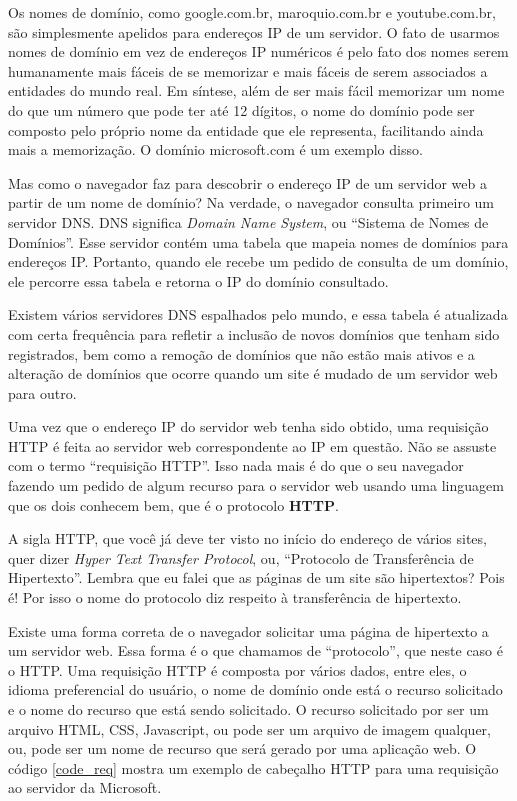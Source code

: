 Os nomes de domínio, como google.com.br, maroquio.com.br e youtube.com.br, são simplesmente apelidos para endereços IP de um servidor. O fato de usarmos nomes de domínio em vez de endereços IP numéricos é pelo fato dos nomes serem humanamente mais fáceis de se memorizar e mais fáceis de serem associados a entidades do mundo real. Em síntese, além de ser mais fácil memorizar um nome do que um número que pode ter até 12 dígitos, o nome do domínio pode ser composto pelo próprio nome da entidade que ele representa, facilitando ainda mais a memorização. O domínio microsoft.com é um exemplo disso.

Mas como o navegador faz para descobrir o endereço IP de um servidor web a partir de um nome de domínio? Na verdade, o navegador consulta primeiro um servidor DNS. DNS significa \textit{Domain Name System}, ou ``Sistema de Nomes de Domínios''. Esse servidor contém uma tabela que mapeia nomes de domínios para endereços IP. Portanto, quando ele recebe um pedido de consulta de um domínio, ele percorre essa tabela e retorna o IP do domínio consultado.

Existem vários servidores DNS espalhados pelo mundo, e essa tabela é atualizada com certa frequência para refletir a inclusão de novos domínios que tenham sido registrados, bem como a remoção de domínios que não estão mais ativos e a alteração de domínios que ocorre quando um site é mudado de um servidor web para outro.

Uma vez que o endereço IP do servidor web tenha sido obtido, uma requisição HTTP é feita ao servidor web correspondente ao IP em questão. Não se assuste com o termo ``requisição HTTP''. Isso nada mais é do que o seu navegador fazendo um pedido de algum recurso para o servidor web usando uma linguagem que os dois conhecem bem, que é o protocolo \textbf{HTTP}. 

A sigla HTTP, que você já deve ter visto no início do endereço de vários sites, quer dizer \textit{Hyper Text Transfer Protocol}, ou, ``Protocolo de Transferência de Hipertexto''. Lembra que eu falei que as páginas de um site são hipertextos? Pois é! Por isso o nome do protocolo diz respeito à transferência de hipertexto.

Existe uma forma correta de o navegador solicitar uma página de hipertexto a um servidor web. Essa forma é o que chamamos de ``protocolo'', que neste caso é o HTTP. Uma requisição HTTP é composta por vários dados, entre eles, o idioma preferencial do usuário, o nome de domínio onde está o recurso solicitado e o nome do recurso que está sendo solicitado. O recurso solicitado por ser um arquivo HTML, CSS, Javascript, ou pode ser um arquivo de imagem qualquer, ou, pode ser um nome de recurso que será gerado por uma aplicação web. O código \ref{code_req} mostra um exemplo de cabeçalho HTTP para uma requisição ao servidor da Microsoft.

